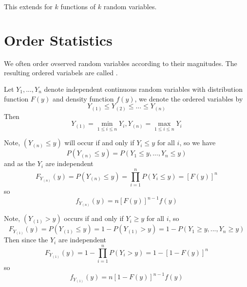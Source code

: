 \documentclass[12pt, a4paper, twoside, openright, titlepage]{book}
\begin{document}
This extends for $k$ functions of $k$ random variables.


\section{\textsection Order Statistics}


\begin{rmk}{}{}
    We often order ovserved random variables according to their magnitudes. The resulting ordered variabels are called .
\end{rmk}


\begin{defn}{}{}
    Let $Y_1,...,Y_n$ denote independent continuous random variables with distribution function $F(y)$ and density function $f(y)$, we denote the ordered variables by \begin{equation*}
        Y_{(1)} \leq Y_{(2)} \leq ... \leq Y_{(n)}
    \end{equation*}
    Then \begin{equation*}
        Y_{(1)} = \min\limits_{1\leq i \leq n}Y_i, Y_{(n)} = \max\limits_{1\leq i \leq n}Y_i
    \end{equation*}
\end{defn}

\begin{defn}{}{}
    Note, $(Y_{(n)} \leq y)$ will occur if and only if $Y_i \leq y$ for all $i$, so we have \begin{equation*}
        P(Y_{(n)} \leq y) = P(Y_1\leq y,..., Y_n \leq y)
    \end{equation*}
    and as the $Y_i$ are independent \begin{equation*}
        F_{Y_{(n)}}(y) = P(Y_{(n)}\leq y) = \prod_{i=1}^nP(Y_i\leq y) = [F(y)]^n
    \end{equation*}
    so \begin{equation*}
        f_{Y_{(n)}}(y) = n[F(y)]^{n-1}f(y)
    \end{equation*}
\end{defn}

\begin{defn}{}{}
    Note, $(Y_{(1)} > y)$ occurs if and only if $Y_i \geq y$ for all $i$, so \begin{equation*}
        F_{Y_{(1)}}(y) = P(Y_{(1)} \leq y) = 1 - P(Y_{(1)} > y) = 1 - P(Y_1 \geq y,..., Y_n\geq y)
    \end{equation*}
    Then since the $Y_i$ are independent \begin{equation*}
        F_{Y_{(1)}}(y) = 1-\prod_{i=1}^nP(Y_i>y) = 1 - [1-F(y)]^n
    \end{equation*}
    so \begin{equation*}
        f_{Y_{(1)}}(y) = n[1-F(y)]^{n-1}f(y)
    \end{equation*}
\end{defn}
\end{document}
